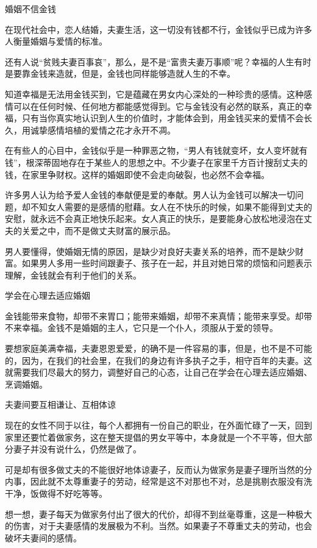 \documentclass[12pt,UTF8]{ctexbook}
\begin{document}
婚姻不信金钱


在现代社会中，恋人结婚，夫妻生活，这一切没有钱都不行，金钱似乎已成为许多人衡量婚姻与爱情的标准。

还有人说“贫贱夫妻百事哀”，那么，是不是“富贵夫妻万事顺”呢？幸福的人生有时是要靠金钱来造就，但是，金钱也同样能够造就人生的不幸。

知道幸福是无法用金钱买到，它是蕴藏在男女内心深处的一种珍贵的感情。这种感情可以在任何时候、任何地方都能感觉得到。它与金钱没有必然的联系，真正的幸福，只有当你真实地认识到人生的价值时，才能体会到，用金钱买来的爱情不会长久，用诚挚感情培植的爱情之花才永开不凋。

在有些人的心目中，金钱似乎是一种罪恶之物，“男人有钱就变坏，女人变坏就有钱”，根深蒂固地存在于某些人的思想之中。不少妻子在家里千方百计搜刮丈夫的钱，在家里争财权。这样的婚姻即使不会走向破裂，也必然不会幸福。

许多男人认为给予爱人金钱的奉献便是爱的奉献。男人认为金钱可以解决一切问题，却不知女人需要的是感情的慰藉。女人在不快乐的时候，如果不能得到丈夫的安慰，就永远不会真正地快乐起来。女人真正的快乐，是要能身心放松地浸泡在丈夫的关爱之中，而不是做丈夫财富的展示品。

男人要懂得，使婚姻无情的原因，是缺少对良好夫妻关系的培养，而不是缺少财富。如果男人多用一些时间跟妻子、孩子在一起，并且对她日常的烦恼和问题表示理解，金钱就会有利于他们的关系。





学会在心理去适应婚姻


金钱能带来食物，却带不来胃口；能带来婚姻，却带不来真情；能带来享受。却带不来幸福。金钱不是婚姻的主人，它只是一个仆人，须服从于爱的领导。

要想家庭美满幸福，夫妻恩恩爱爱，的确不是一件容易的事，但是，也不是不可能的，因为，在我们的社会里，在我们的身边有许多执子之手，相守百年的夫妻。这就需要我们尽最大的努力，调整好自己的心态，让自己在学会在心理去适应婚姻、烹调婚姻。





夫妻间要互相谦让、互相体谅


现在的女性不同于以往，每个人都拥有一份自己的职业，在外面忙碌了一天，回到家里还要忙着做家务，这在整天提倡的男女平等中，本身就是一个不平等，但大部分妻子并没有说什么，仍然是做了。

可是却有很多做丈夫的不能很好地体谅妻子，反而认为做家务是妻子理所当然的分内事，因此就不太尊重妻子的劳动，经常是这不对那也不对，总是挑剔衣服没有洗干净，饭做得不好吃等等。

想一想，妻子每天为做家务付出了很大的代价，却得不到丝毫尊重，这是一种极大的伤害，对于夫妻感情的发展极为不利。当然。如果妻子不尊重丈夫的劳动，也会破坏夫妻间的感情。
\end{document}
